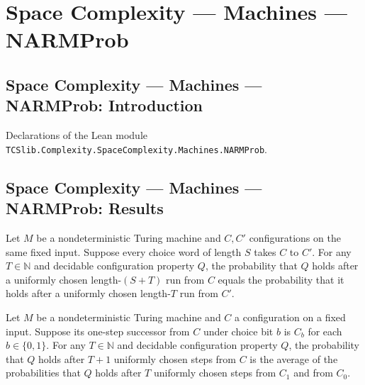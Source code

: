\section{Space Complexity --- Machines --- NARMProb}
\subsection*{Space Complexity --- Machines --- NARMProb: Introduction}

Declarations of the Lean module \texttt{TCSlib.Complexity.SpaceComplexity.Machines.NARMProb}.

\subsection*{Space Complexity --- Machines --- NARMProb: Results}

\begin{lemma}
\label{Complexity.LogProg.randProb_runWith_seg}
\leanok
{}
Let $M$ be a nondeterministic Turing machine and $C,C'$ configurations on the same fixed
input. Suppose every choice word of length $S$ takes $C$ to $C'$. For any
$T\in\mathbb{N}$ and decidable configuration property $Q$, the probability that $Q$
holds after a uniformly chosen length-$(S+T)$ run from $C$ equals the probability that
it holds after a uniformly chosen length-$T$ run from $C'$.
\end{lemma}

\begin{lemma}
\label{Complexity.LogProg.randProb_runWith_choose}
\leanok
{}
Let $M$ be a nondeterministic Turing machine and $C$ a configuration on a fixed input.
Suppose its one-step successor from $C$ under choice bit $b$ is $C_b$ for each
$b\in\{0,1\}$. For any $T\in\mathbb{N}$ and decidable configuration property $Q$, the
probability that $Q$ holds after $T+1$ uniformly chosen steps from $C$ is the average of
the probabilities that $Q$ holds after $T$ uniformly chosen steps from $C_1$ and from
$C_0$.
\end{lemma}

